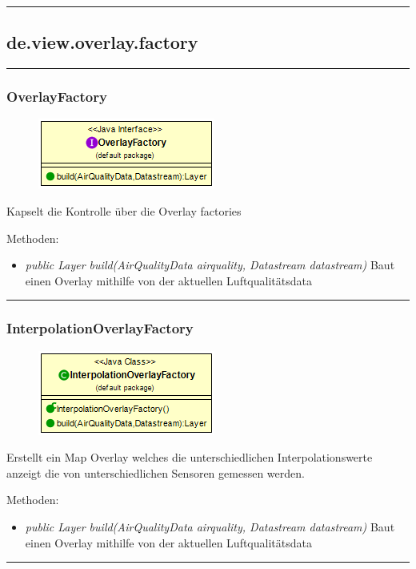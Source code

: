 \rule{\textwidth}{0.4pt}
\subsection{de.view.overlay.factory}

\rule{\textwidth}{0.4pt}
\subsubsection{OverlayFactory}
\begin{minipage}{0.3\textwidth}
    \begin{figure}[H]
        {\centering\includegraphics[scale = 0.6
        ]{media/view/factory/OverlayFactory_Class.png}}
    \end{figure}
    \end{minipage} \hfill
    \begin{minipage}{0.6\textwidth}
Kapselt die Kontrolle über die Overlay factories
\end{minipage}
Methoden: \begin{itemize} [noitemsep]
    \item \emph{public Layer build(AirQualityData airquality,  Datastream datastream)}  Baut einen Overlay mithilfe von der aktuellen Luftqualitätsdata
\end{itemize}

\rule{\textwidth}{0.4pt}
\subsubsection{InterpolationOverlayFactory}
\begin{minipage}{0.3\textwidth}
    \begin{figure}[H]
        {\centering\includegraphics[scale = 0.5
        ]{media/view/factory/InterpolationOverlayFactory_Class.png}}
    \end{figure}
    \end{minipage} \hfill
    \begin{minipage}{0.6\textwidth}
Erstellt ein Map Overlay welches die unterschiedlichen Interpolationswerte anzeigt die von unterschiedlichen Sensoren gemessen werden.
\end{minipage}
Methoden: \begin{itemize} [noitemsep]
    \item \emph{public Layer build(AirQualityData airquality,  Datastream datastream)} Baut einen Overlay mithilfe von der aktuellen Luftqualitätsdata
\end{itemize}
    \rule{\textwidth}{0.4pt}

